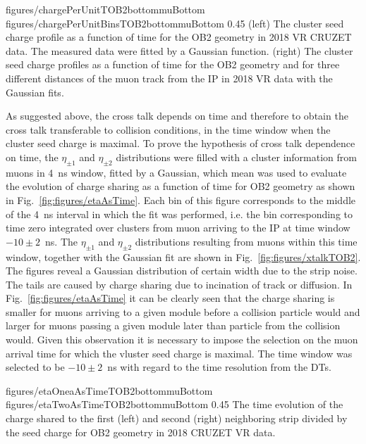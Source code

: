                  {figures/chargePerUnitTOB2bottommuBottom}
                 {figures/chargePerUnitBinsTOB2bottommuBottom} %
                 {0.45}       %
                 {(left) The cluster seed charge profile as a function of time for the OB2 geometry in 2018 VR CRUZET data. The measured data were fitted by a Gaussian function. (right) The cluster seed charge profiles as a function of time for the OB2 geometry and for three different distances of the muon track from the IP in 2018 VR data with the Gaussian fits. }

As suggested above, the cross talk depends on time and therefore to obtain the cross talk transferable to collision conditions, in the time window when the cluster seed charge is maximal. To prove the hypothesis of cross talk dependence on time, the $\eta_{\pm 1}$ and $\eta_{\pm 2}$ distributions were filled with a cluster information from muons in 4~ns window, fitted by a Gaussian, which mean was used to evaluate the evolution of charge sharing as a function of time for OB2 geometry as shown in Fig.~\ref{fig:figures/etaAsTime}. Each bin of this figure corresponds to the middle of the 4~ns interval in which the fit was performed, i.e. the bin corresponding to time zero integrated over clusters from muon arriving to the IP at time window $-10 \pm 2$~ns. The $\eta_{\pm 1}$ and $\eta_{\pm 2}$ distributions resulting from muons within this time window, together with the Gaussian fit are shown in Fig.~\ref{fig:figures/xtalkTOB2}. The figures reveal a Gaussian distribution of certain width due to the strip noise. The tails are caused by charge sharing due to incination of track or diffusion. In Fig.~\ref{fig:figures/etaAsTime} it can be clearly seen that the charge sharing is smaller for muons arriving to a given module before a collision particle would and larger for muons passing a given module later than particle from the collision would. Given this observation it is necessary to impose the selection on the muon arrival time for which the vluster seed charge is maximal. The time window was selected to be $-10 \pm 2$~ns with regard to the time resolution from the DTs.


                 {figures/etaOneaAsTimeTOB2bottommuBottom}
                 {figures/etaTwoAsTimeTOB2bottommuBottom} %
                 {0.45}       %
                 { The time evolution of the charge shared to the first (left) and second (right) neighboring strip divided by the seed charge for OB2 geometry in 2018 CRUZET VR data.}

